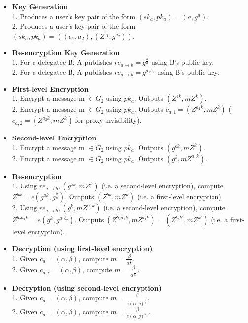 \begin{itemize}
  \item
    \textbf{Key Generation} \\
    1. Produces a user's key pair of the form $(sk_a, pk_a) = (a, g^a)$. \\
    2. Produces a user's key pair of the form $(sk_a, pk_a) = ((a_1, a_2), (Z^{a_1}, g^{a_2}))$.
  \item
    \textbf{Re-encryption Key Generation} \\
    1. For a delegatee B, A publishes $re_{a \rightarrow b} = g^{\frac{b}{a}}$ using B's public key. \\
    2. For a delegatee B, A publishes $re_{a \rightarrow b} = g^{a_1 b_2}$ using B's public key.
  \item
    \textbf{First-level Encryption} \\
    1. Encrypt a message m $\in G_2$ using $pk_a$. Outputs $(Z^{ak}, mZ^{k})$. \\
    2. Encrypt a message m $\in G_2$ using $pk_a$. Outputs $c_{a, 1} = (Z^{a_1 k}, mZ^{k})$ ($c_{a, 2} = (Z^{a_2 k}, mZ^{k})$ for proxy invisibility).
  \item
    \textbf{Second-level Encryption} \\
    1. Encrypt a message m $\in G_2$ using $pk_a$. Outputs $(g^{ak}, mZ^{k})$. \\
    2. Encrypt a message m $\in G_2$ using $pk_a$. Outputs $(g^k, mZ^{a_1 k})$.
  \item
    \textbf{Re-encryption} \\
    1. Using $re_{a \rightarrow b}, (g^{ak}, mZ^{k})$ (i.e. a second-level encryption), compute $Z^{bk} = e(g^{ak}, g^{\frac{b}{a}})$. Outputs $(Z^{bk}, mZ^{k})$ (i.e. a first-level encryption). \\
    2. Using $re_{a \rightarrow b}, (g^k, mZ^{a_1 k})$ (i.e. a second-level encryption), compute $Z^{b_2 a_1 k} = e(g^k, g^{a_1 b_2})$. Outputs $(Z^{b_2 a_1 k}, mZ^{a_1 k}) = (Z^{b_2 k'}, mZ^{k'})$ (i.e. a first-level encryption).
  \item
    \textbf{Decryption (using first-level encryption)} \\
    1. Given $c_a = (\alpha, \beta)$, compute $m = \frac{\beta}{\alpha^{\frac{1}{a}}}$. \\
    2. Given $c_{a, i} = (\alpha, \beta)$, compute $m = \frac{\beta}{\alpha^{\frac{1}{a_i}}}$.
  \item
    \textbf{Decryption (using second-level encryption)} \\
    1. Given $c_a = (\alpha, \beta)$, compute $m = \frac{\beta}{e(\alpha, g)^{\frac{1}{a}}}$. \\
    2. Given $c_a = (\alpha, \beta)$, compute $m = \frac{\beta}{e(\alpha, g)^{a_1}}$.
\end{itemize}

